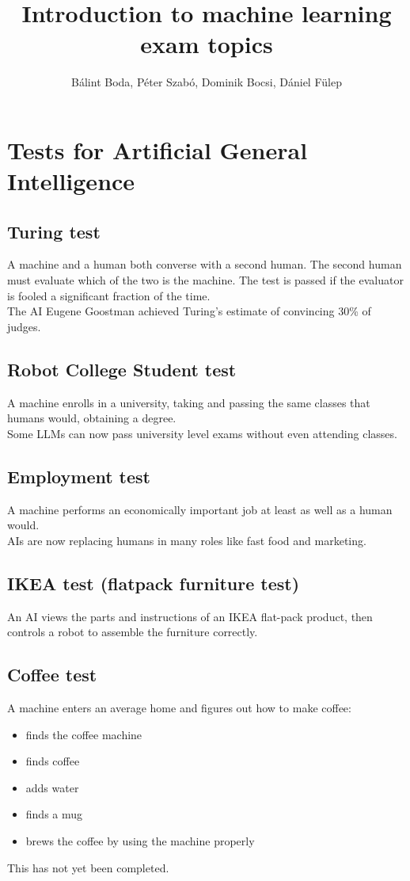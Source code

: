 \documentclass[a4paper,12pt,answers]{article}
\title{\huge{Introduction to machine learning} \\[-4pt] \large exam topics \vspace{-15pt}}
\author{Bálint Boda, Péter Szabó, Dominik Bocsi, Dániel Fülep}
\date{\vspace{-12pt}{Fall 2023}}
\begin{document}
	\maketitle
	\tableofcontents
	\newpage
	
	\section{Tests for Artificial General Intelligence}
	\subsection{Turing test}
	A machine and a human both converse with a second human. The second human must evaluate which of the two is the machine.
	The test is passed if the evaluator is fooled a significant fraction of the time.
	\\[4pt]
	\noindent
	The AI Eugene Goostman achieved Turing's estimate of convincing 30\% of judges.
	
	
	\subsection{Robot College Student test }
	A machine enrolls in a university, taking and passing the same classes that humans would, obtaining a degree.
	\\[4pt]
	\noindent
	Some LLMs can now pass university level exams without even attending classes.
	
	
	\subsection{Employment test}
	A machine performs an economically important job at least as well as a human would.
	\\[4pt]
	\noindent
	AIs are now replacing humans in many roles like fast food and marketing.
	
	\subsection{IKEA test (flatpack furniture test)}
	An AI views the parts and instructions of an IKEA flat-pack product, then controls a robot to assemble the furniture correctly.
	
	
	\subsection{Coffee test}
	A machine enters an average home and figures out how to make coffee:
	\begin{itemize}
		\item finds the coffee machine
		\item finds coffee
		\item adds water
		\item finds a mug
		\item brews the coffee by using the machine properly
	\end{itemize}
	\noindent
	This has not yet been completed.
	\newpage
	
\end{document}
